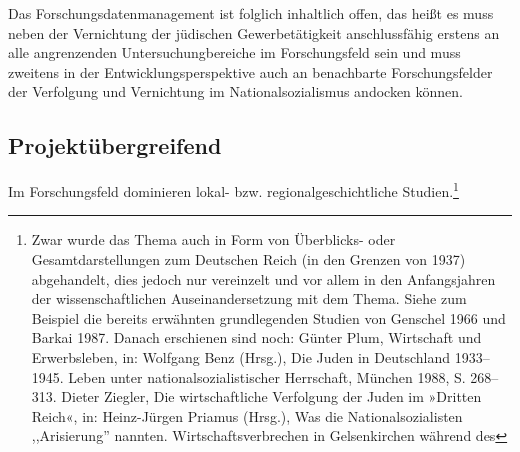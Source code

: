 Das Forschungsdatenmanagement ist folglich inhaltlich offen, das heißt es muss neben der Vernichtung der jüdischen Gewerbetätigkeit anschlussfähig erstens an alle angrenzenden Untersuchungbereiche im Forschungsfeld sein und muss zweitens in der Entwicklungsperspektive auch an benachbarte Forschungsfelder der Verfolgung und Vernichtung im Nationalsozialismus andocken können. 

\subsection{Projektübergreifend}

Im Forschungsfeld dominieren lokal- bzw. regionalgeschichtliche Studien.\footnote{Zwar wurde das Thema auch in Form von Überblicks- oder Gesamtdarstellungen zum Deutschen Reich (in den Grenzen von 1937) abgehandelt, dies jedoch nur vereinzelt und vor allem in den Anfangsjahren der wissenschaftlichen Auseinandersetzung mit dem Thema. Siehe zum Beispiel die bereits erwähnten grundlegenden Studien von Genschel 1966 und Barkai 1987. Danach erschienen sind noch: Günter
Plum, Wirtschaft und Erwerbsleben, in: Wolfgang Benz (Hrsg.), Die Juden in Deutschland 1933–
1945. Leben unter nationalsozialistischer Herrschaft, München 1988, S. 268–313. Dieter Ziegler, Die wirtschaftliche
Verfolgung der Juden im »Dritten Reich«, in: Heinz-Jürgen Priamus (Hrsg.), Was die
Nationalsozialisten ,,Arisierung'' nannten. Wirtschaftsverbrechen in Gelsenkirchen während des
}
